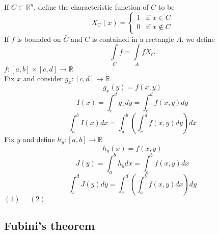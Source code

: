 \documentclass[12pt]{article}
\def\RR{\mathbb{R}}
\begin{document}
If $C \subset \RR^n$, define the characteristic function of $C$ to be 
\[X_{C}(x) =\begin{cases}
  1 & \text{if } x \in C \\
   0      & \text{if } x \notin C
  \end{cases} \]
\setcounter{equation}{0}
If $f$ is bounded on $\bar{C}$ and $C$ is contained in a rectangle $A$, we define 
\[\int\limits_{C}f = \int\limits_{A}fX_{C}\]
$f:[a,b]\times[c,d] \rightarrow \RR$\\
Fix $x$ and consider $g_{x}:[c,d]\rightarrow\RR$ 
\[g_{x}(y) = f(x,y)\]
\[I(x)=\int_{c}^{d}g_{x}dy = \int_c^df(x,y)dy\]
\begin{equation}
\int_a^bI(x)dx = \int_a^b\left(\int_c^df(x,y)dy\right)dx
\end{equation}
Fix $y$ and define $h_{y}:[a,b]\rightarrow\RR$
\[h_y(x)=f(x,y)\]
\[J(y)=\int_{a}^{b}h_{y}dx = \int_a^bf(x,y)dx\]
\begin{equation}
\int_c^dJ(y)dy = \int_c^d\left(\int_a^bf(x,y)dx\right)dy
\end{equation}
$(1) = (2)$

\subsection{Fubini's theorem}
\end{document}
